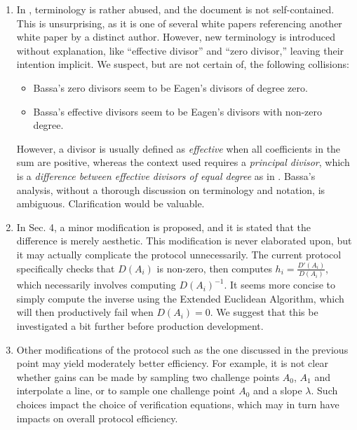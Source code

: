 \documentclass{article}
\theoremstyle{definition}
\newcommand{\6}{\mathbf}
\newcommand{\7}{\mathcal}
\newcommand{\luke}[1]{{\textcolor{purple}{#1}}}
\begin{document}
\begin{enumerate}
    \item In \cite{BassaSoundnessIPDL}, terminology is rather abused, and the document is not self-contained. This is unsurprising, as it is one of several white papers referencing another white paper by a distinct author. However, new terminology is introduced without explanation, like ``effective divisor'' and ``zero divisor,'' leaving their intention implicit. We suspect, but are not certain of, the following collisions:
    \begin{itemize}
    \item Bassa's zero divisors seem to be Eagen's divisors of degree zero. 
    \item Bassa's effective divisors seem to be Eagen's divisors with non-zero degree. 
    \end{itemize}
    However, a divisor is usually defined as \textit{effective} when all coefficients in the sum are positive, whereas the context used requires a \textit{principal divisor}, which is a \textit{difference between effective divisors of equal degree} as in \cite{silverman2009arithmetic}. Bassa's analysis, without a thorough discussion on terminology and notation, is ambiguous.  Clarification would be valuable.

    \item In Sec. 4, a minor modification is proposed, and it is stated that the difference is merely aesthetic. This modification is never elaborated upon, but it may actually complicate the protocol unnecessarily. The current protocol specifically checks that $D(A_i)$ is non-zero, then computes $h_i = \frac{D'(A_i)}{D(A_i)}$, which necessarily involves computing $D(A_i)^{-1}$. It seems more concise to simply compute the inverse using the Extended Euclidean Algorithm, which will then productively fail when $D(A_i)=0$. We suggest that this be investigated a bit further before production development.

    \item Other modifications of the protocol such as the one discussed in the previous point may yield moderately better efficiency. For example, it is not clear whether gains can be made by sampling two challenge points $A_0$, $A_1$ and interpolate a line, or to sample one challenge point $A_0$ and a slope $\lambda$. Such choices impact the choice of verification equations, which may in turn have impacts on overall protocol efficiency.



\end{enumerate}
\end{document}
